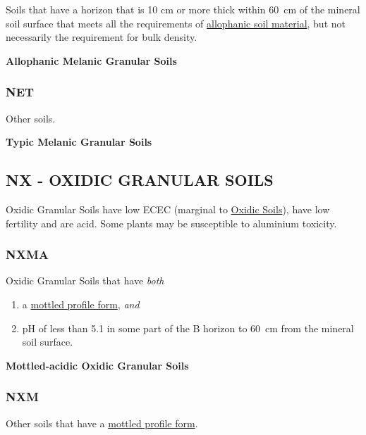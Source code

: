 \documentclass[
  letterpaper,
  DIV=11,
  numbers=noendperiod]{scrreprt}
\providecommand{\tightlist}{%
  \setlength{\itemsep}{0pt}\setlength{\parskip}{0pt}}\usepackage{longtable,booktabs,array}
\begin{document}
Soils that have a horizon that is 10 cm or more thick within 60~cm of
the mineral soil surface that meets all the requirements of
\protect\hyperlink{sec-diag-alloph}{allophanic soil material}, but not
necessarily the requirement for bulk density.

\textbf{Allophanic Melanic Granular Soils}

\hypertarget{sec-key-NET}{%
\subsubsection{\texorpdfstring{\textbf{NET}}{NET}}\label{sec-key-NET}}

Other soils.

\textbf{Typic Melanic Granular Soils}

\hypertarget{sec-NX}{%
\subsection{\texorpdfstring{\textbf{NX} - OXIDIC GRANULAR
SOILS}{NX - OXIDIC GRANULAR SOILS}}\label{sec-NX}}

Oxidic Granular Soils have low ECEC (marginal to
\protect\hyperlink{sec-X}{Oxidic Soils}), have low fertility and are
acid. Some plants may be susceptible to aluminium toxicity.

\hypertarget{sec-key-NXMA}{%
\subsubsection{\texorpdfstring{\textbf{NXMA}}{NXMA}}\label{sec-key-NXMA}}

Oxidic Granular Soils that have \emph{both}

\begin{enumerate}
\def\labelenumi{\arabic{enumi}.}
\tightlist
\item
  a \protect\hyperlink{sec-diag-mottpf}{mottled profile form},
  \emph{and}
\item
  pH of less than 5.1 in some part of the B horizon to 60~cm from the
  mineral soil surface.
\end{enumerate}

\textbf{Mottled-acidic Oxidic Granular Soils}

\hypertarget{sec-key-NXM}{%
\subsubsection{\texorpdfstring{\textbf{NXM}}{NXM}}\label{sec-key-NXM}}

Other soils that have a \protect\hyperlink{sec-diag-mottpf}{mottled
profile form}.
\end{document}
